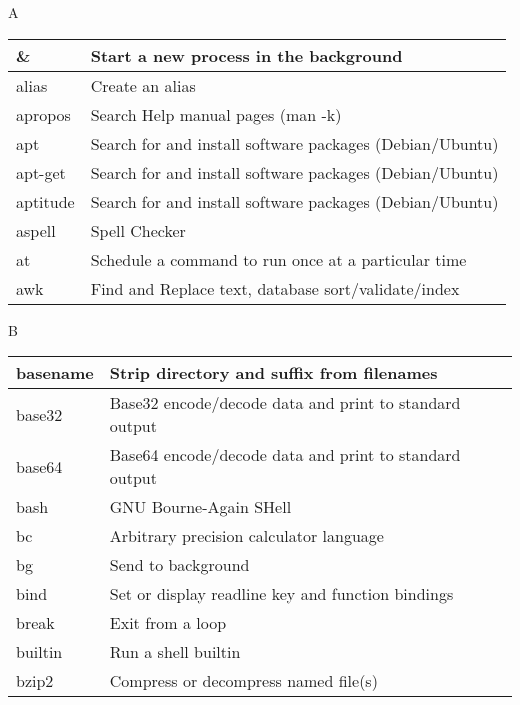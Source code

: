 \setlength{\columnsep}{3pt}
\begin{flushleft}

\begin{tcolorbox}
	\textsc{A}
\end{tcolorbox}
\begin{tabular}{lp{12cm}}
	\hline
	\& & Start a new process in the background \\
	\hline
	alias &	Create an alias \\
	\hline
	apropos &	Search Help manual pages (man -k) \\
	\hline
	apt &	Search for and install software packages (Debian/Ubuntu) \\
	\hline
	apt-get &	Search for and install software packages (Debian/Ubuntu) \\
	\hline
	aptitude & Search for and install software packages (Debian/Ubuntu) \\
	\hline
	aspell &	Spell Checker \\
	\hline
	at &	Schedule a command to run once at a particular time \\
	\hline
	awk &	Find and Replace text, database sort/validate/index \\
	\hline
\end{tabular}

\newpage


\begin{tcolorbox}
	\textsc{B}
\end{tcolorbox}
\begin{tabular}{lp{12cm}}
	\hline
	basename & Strip directory and suffix from filenames \\
	\hline
	base32 &	Base32 encode/decode data and print to standard output \\
	\hline
	base64 &	Base64 encode/decode data and print to standard output \\
	\hline
	bash &	GNU Bourne-Again SHell \\
	\hline
	bc &	Arbitrary precision calculator language \\
	\hline
	bg &	Send to background \\
	\hline
	bind &	Set or display readline key and function bindings \\
	\hline
	break &	Exit from a loop \\
	\hline
	builtin &	Run a shell builtin \\
	\hline
	bzip2 &	Compress or decompress named file(s) \\
	\hline
\end{tabular}


\end{flushleft}
